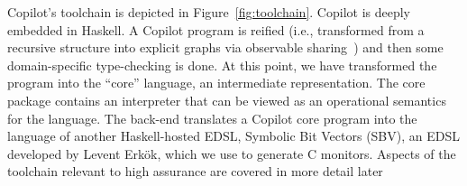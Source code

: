 Copilot's toolchain is depicted in Figure~\ref{fig:toolchain}.  Copilot is deeply embedded in Haskell.  A Copilot program is
reified (i.e., transformed from a recursive structure into explicit graphs via
observable sharing~\cite{gill}) and then some domain-specific type-checking is
done.  At this point, we have transformed the program into the ``core''
language, an intermediate representation.  The core package contains
an  interpreter  that can be viewed as an operational semantics for
the language.   The back-end translates a Copilot core program into the language of another
Haskell-hosted EDSL, 
Symbolic Bit Vectors (SBV),  an EDSL developed by Levent Erk\"{o}k, which we use to generate C
monitors.  Aspects of the toolchain relevant to high assurance are covered in more
detail later




